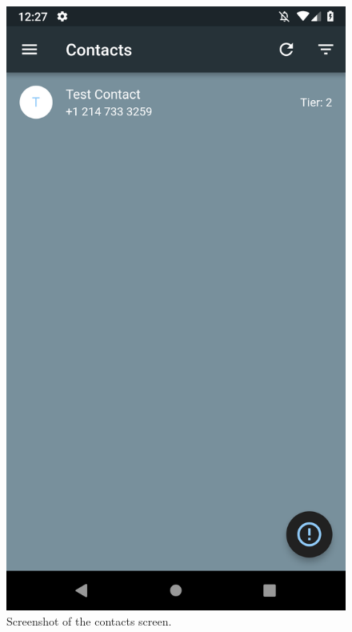 \documentclass[10pt, a4paper]{article}
\begin{document}
\begin{figure}[H]
  \includegraphics[width=\linewidth]{final-diagrams/Emulator-Screenshots/Screenshot_1556126822.png}
  \caption{Screenshot of the contacts screen.}
\endminipage\hfill
{}

\end{figure}
\end{document}
